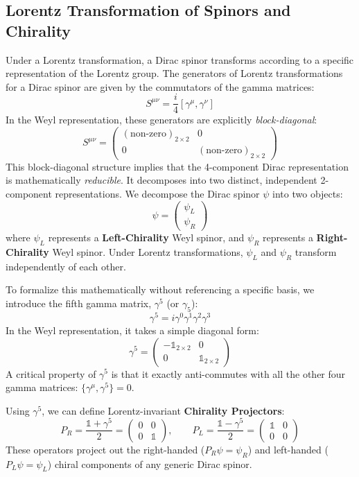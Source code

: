\subsection{Lorentz Transformation of Spinors and Chirality}

Under a Lorentz transformation, a Dirac spinor transforms according to a specific representation of the Lorentz group. The generators of Lorentz transformations for a Dirac spinor are given by the commutators of the gamma matrices:
\[
    S^{\mu\nu} = \frac{i}{4} [\gamma^\mu, \gamma^\nu]
\]
In the Weyl representation, these generators are explicitly \textit{block-diagonal}:
\[
    S^{\mu\nu} = \begin{pmatrix} (\text{non-zero})_{2\times 2} & 0 \\ 0 & (\text{non-zero})_{2\times 2} \end{pmatrix}
\]
This block-diagonal structure implies that the 4-component Dirac representation is mathematically \textit{reducible}. It decomposes into two distinct, independent 2-component representations. We decompose the Dirac spinor $\psi$ into two objects:
\[
    \psi = \begin{pmatrix} \psi_L \\ \psi_R \end{pmatrix}
\]
where $\psi_L$ represents a \textbf{Left-Chirality} Weyl spinor, and $\psi_R$ represents a \textbf{Right-Chirality} Weyl spinor. Under Lorentz transformations, $\psi_L$ and $\psi_R$ transform independently of each other.

To formalize this mathematically without referencing a specific basis, we introduce the fifth gamma matrix, $\gamma^5$ (or $\gamma_5$):
\[
    \gamma^5 = i\gamma^0 \gamma^1 \gamma^2 \gamma^3
\]
In the Weyl representation, it takes a simple diagonal form:
\[
    \gamma^5 = \begin{pmatrix} -\mathbb{1}_{2\times 2} & 0 \\ 0 & \mathbb{1}_{2\times 2} \end{pmatrix}
\]
A critical property of $\gamma^5$ is that it exactly anti-commutes with all the other four gamma matrices: $\{ \gamma^\mu, \gamma^5 \} = 0$.

Using $\gamma^5$, we can define Lorentz-invariant \textbf{Chirality Projectors}:
\[
    P_R = \frac{\mathbb{1} + \gamma^5}{2} = \begin{pmatrix} 0 & 0 \\ 0 & \mathbb{1} \end{pmatrix}, \qquad P_L = \frac{\mathbb{1} - \gamma^5}{2} = \begin{pmatrix} \mathbb{1} & 0 \\ 0 & 0 \end{pmatrix}
\]
These operators project out the right-handed ($P_R \psi = \psi_R$) and left-handed ($P_L \psi = \psi_L$) chiral components of any generic Dirac spinor.

